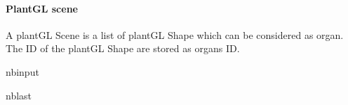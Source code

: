 \documentclass[letterpaper,10pt,english]{sphinxmanual}
\begin{document}
\paragraph{PlantGL scene}
\label{\detokenize{input_scenes:PlantGL-scene}}
\sphinxAtStartPar
A plantGL Scene is a list of plantGL Shape which can be considered as organ. The ID of the plantGL Shape are stored as organs ID.

\begin{sphinxuseclass}{nbinput}
\begin{sphinxuseclass}{nblast}
{
\begin{sphinxVerbatim}[commandchars=\\\{\}]
\llap{\color{nbsphinxin}[7]:\,\hspace{\fboxrule}\hspace{\fboxsep}}   

  \PYG{p}{[}  
                           \PYG{p}{]}
\end{sphinxVerbatim}
}

\end{sphinxuseclass}
\end{sphinxuseclass}
\end{document}
